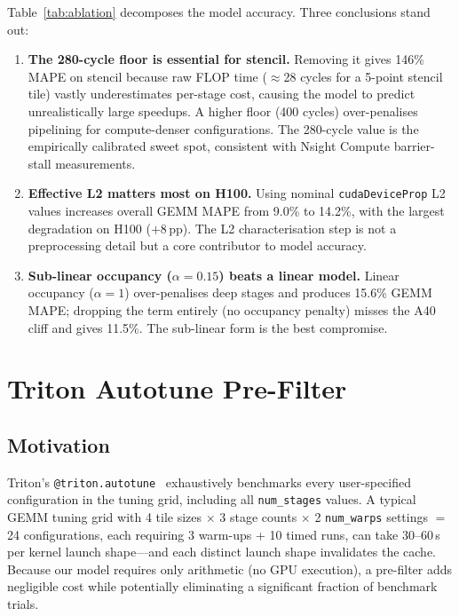 \documentclass[10pt,twocolumn]{article}
\begin{document}
Table~\ref{tab:ablation} decomposes the model accuracy.  Three
conclusions stand out:
\begin{enumerate}
\item \textbf{The 280-cycle floor is essential for stencil.}
  Removing it gives 146\% MAPE on stencil because raw FLOP time
  ($\approx$28 cycles for a 5-point stencil tile) vastly
  underestimates per-stage cost, causing the model to predict
  unrealistically large speedups.  A higher floor (400 cycles)
  over-penalises pipelining for compute-denser configurations.  The
  280-cycle value is the empirically calibrated sweet spot,
  consistent with Nsight Compute barrier-stall measurements.
\item \textbf{Effective L2 matters most on H100.}  Using nominal
  \texttt{cudaDeviceProp} L2 values increases overall GEMM MAPE
  from 9.0\% to 14.2\%, with the largest degradation on H100
  ($+$8\,pp).  The L2 characterisation step is not a
  preprocessing detail but a core contributor to model accuracy.
\item \textbf{Sub-linear occupancy ($\alpha = 0.15$) beats a linear
  model.}  Linear occupancy ($\alpha = 1$) over-penalises deep
  stages and produces 15.6\% GEMM MAPE; dropping the term entirely
  (no occupancy penalty) misses the A40 cliff and gives 11.5\%.
  The sub-linear form is the best compromise.
\end{enumerate}

\section{Triton Autotune Pre-Filter}
\label{sec:triton}

\subsection{Motivation}

Triton's \texttt{@triton.autotune}~\cite{triton} exhaustively
benchmarks every user-specified configuration in the tuning grid,
including all \texttt{num\_stages} values.  A typical GEMM tuning
grid with 4 tile sizes $\times$ 3 stage counts $\times$ 2
\texttt{num\_warps} settings $=$ 24 configurations, each requiring
3 warm-ups + 10 timed runs, can take 30--60\,s per kernel launch
shape---and each distinct launch shape invalidates the cache.
Because our model requires only arithmetic (no GPU execution), a
pre-filter adds negligible cost while potentially eliminating a
significant fraction of benchmark trials.
\end{document}
